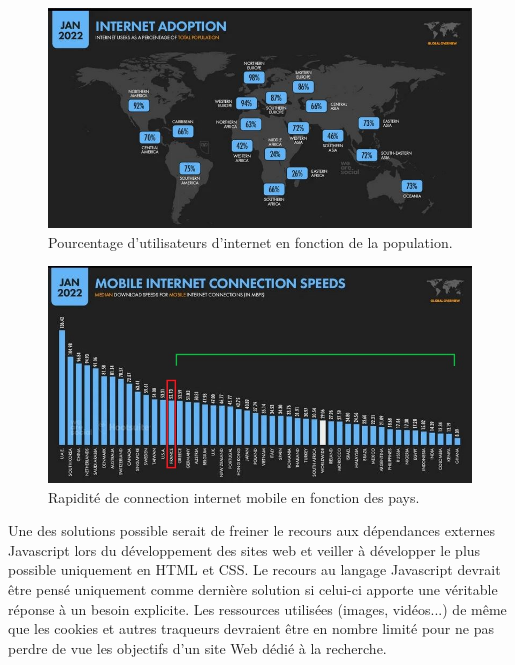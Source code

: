\documentclass[a4paper,12pt,twoside]{book}
\begin{document}
\begin{figure}[H]
    \centering
    \includegraphics[width=13cm]{img/partie_3/internet.JPG}
    \caption[Pourcentage d'utilisateurs d'internet en fonction de la population]{Pourcentage d'utilisateurs d'internet en fonction de la population.\footnotemark}
    \label{internet}
\end{figure}


\begin{figure}[H]
    \centering
    \includegraphics[width=13cm]{img/partie_3/mobile.JPG}
    \caption[Rapidité de connection internet mobile en fonction des pays]{Rapidité de connection internet mobile en fonction des pays.\footnotemark}
    \label{mobile}
\end{figure}


Une des solutions possible serait de freiner le recours aux dépendances externes Javascript lors du développement des sites web et veiller à développer le plus possible uniquement en \acrshort{HTML} et CSS. Le recours au langage Javascript devrait être pensé uniquement comme dernière solution si celui-ci apporte une véritable réponse à un besoin explicite. Les ressources utilisées (images, vidéos...) de même que les cookies et autres traqueurs devraient être en nombre limité pour ne pas perdre de vue les objectifs d'un site Web dédié à la recherche.
\end{document}
